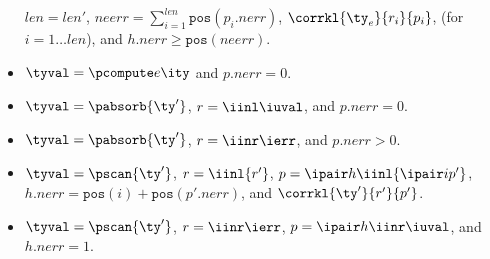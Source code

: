 \begin{definition}
\begin{itemize}
    ${len} = {len}'$, ${neerr} = \sum_{i=1}^{len}
    \mathtt{pos}(p_i.{nerr})$, $\corrkl {\ty_e}
    {r_i} {p_i}$, (for $i=1 \ldots {len}$), and
    $h.{nerr} \geq \mathtt{pos}({neerr})$.
  \item $\tyval = \pcompute e \ity$ and $p.{nerr} = 0$.
  \item $\tyval = \pabsorb {\ty'}$, $r = \iinl \iuval$, and $p.nerr = 0$.
  \item $\tyval = \pabsorb {\ty'}$, $r = \iinr \ierr$, and $p.nerr > 0$.
  \item $\tyval = \pscan {\ty'}$, $r =\iinl {r'}$,
      $p = \ipair h {\iinl {\ipair i {p'}}}$,
      $h.nerr = \mathtt{pos}(i) + \mathtt{pos}(p'.nerr)$, and
      $\corrkl {\ty'}{r'}{p'}$.
  \item $\tyval = \pscan {\ty'}$,
      $r =\iinr \ierr$,
      $p = \ipair h {\iinr \iuval}$, and
      $h.{nerr} = 1$.
  \end{itemize}
\end{definition}

